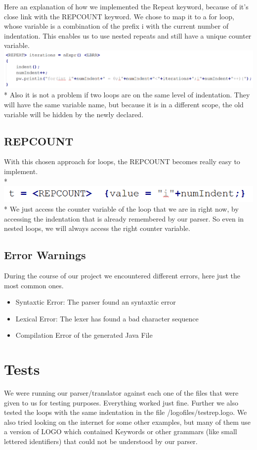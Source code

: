 Here an explanation of how we implemented the Repeat keyword, because of it's close link with the REPCOUNT keyword. We chose to map it to a for loop, whose variable is a combination of the prefix i with the current number of indentation. This enables us to use nested repeats and still have a unique counter variable.
\includegraphics[scale=0.7]{bilder/Repeat.png}\\*
Also it is not a problem if two loops are on the same level of indentation. They will have the same variable name, but because it is in a different scope, the old variable will be hidden by the newly declared.

\subsection{REPCOUNT}
With this chosen approach for loops, the REPCOUNT becomes really easy to implement.\\*
\includegraphics[scale=0.7]{bilder/repcount.png}\\*
We just access the counter variable of the loop that we are in right now, by accessing the indentation that is already remembered by our parser. So even in nested loops, we will always access the right counter variable.

\subsection{Error Warnings}
During the course of our project we encountered different errors, here just the most common ones.
\begin{itemize}
\item Syntaxtic Error: The parser found an syntaxtic error
\item Lexical Error: The lexer has found a bad character sequence
\item Compilation Error of the generated Java File
\end{itemize}

\section{Tests}
\label{sec:tests}
We were running our parser/translator against each one of the files that were given to us for testing purposes. Everything worked just fine. Further we also tested the loops with the same indentation in the file /logofiles/testrep.logo. We also tried looking on the internet for some other examples, but many of them use a version of LOGO which contained Keywords or other grammars (like small lettered identifiers) that could not be understood  by our parser.

